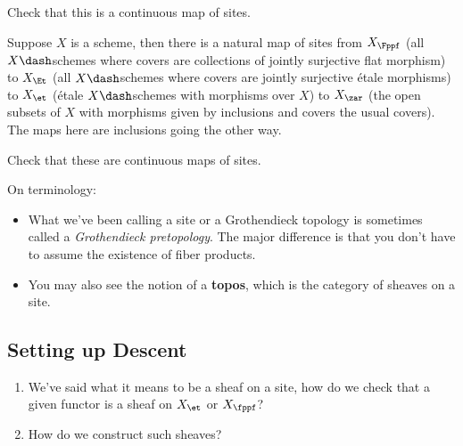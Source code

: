 \begin{exercise}[Check!]

Check that this is a continuous map of sites.

\end{exercise}

\begin{example}[?]

Suppose \(X\) is a scheme, then there is a natural map of sites from
\(X_{\Fppf}\) (all \(X\dash\)schemes where covers are collections of
jointly surjective flat morphism) to \(X_{\Et}\) (all \(X\dash\)schemes
where covers are jointly surjective étale morphisms) to \(X_{\et}\)
(étale \(X\dash\)schemes with morphisms over \(X\)) to \(X_{\zar}\) (the
open subsets of \(X\) with morphisms given by inclusions and covers the
usual covers). The maps here are inclusions going the other way.

\end{example}

\begin{exercise}[Check!]

Check that these are continuous maps of sites.

\end{exercise}

\begin{remark}

\envlist

On terminology:

\begin{itemize}
\item
  What we've been calling a site or a Grothendieck topology is sometimes
  called a \emph{Grothendieck pretopology}. The major difference is that
  you don't have to assume the existence of fiber products.
\item
  You may also see the notion of a \textbf{topos}, which is the category
  of sheaves on a site.
\end{itemize}

\end{remark}

\hypertarget{setting-up-descent}{%
\subsection{Setting up Descent}\label{setting-up-descent}}

\begin{question}

\envlist

\begin{enumerate}
\def\labelenumi{\arabic{enumi}.}
\item
  We've said what it means to be a sheaf on a site, how do we check that
  a given functor is a sheaf on \(X_{\et}\) or \(X_{\fppf}\)?
\item
  How do we construct such sheaves?
\end{enumerate}

\end{question}

